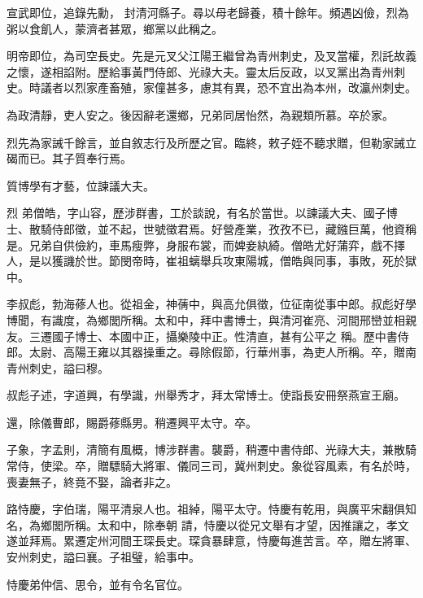 \begin{pinyinscope}
 宣武即位，追錄先勳，
 封清河縣子。尋以母老歸養，積十餘年。頻遇凶儉，烈為粥以食飢人，蒙濟者甚眾，鄉黨以此稱之。



 明帝即位，為司空長史。先是元叉父江陽王繼曾為青州刺史，及叉當權，烈託故義之懷，遂相諂附。歷給事黃門侍郎、光祿大夫。靈太后反政，以叉黨出為青州刺史。時議者以烈家產畜殖，家僮甚多，慮其有異，恐不宜出為本州，改瀛州刺史。



 為政清靜，吏人安之。後因辭老還鄉，兄弟同居怡然，為親類所慕。卒於家。



 烈先為家誡千餘言，並自敘志行及所歷之官。臨終，敕子姪不聽求贈，但勒家誡立碣而已。其子質奉行焉。



 質博學有才藝，位諫議大夫。



 烈
 弟僧皓，字山容，歷涉群書，工於談說，有名於當世。以諫議大夫、國子博士、散騎侍郎徵，並不起，世號徵君焉。好營產業，孜孜不已，藏鏹巨萬，他資稱是。兄弟自供儉約，車馬瘦弊，身服布裳，而婢妾紈綺。僧皓尤好蒲弈，戲不擇人，是以獲譏於世。節閔帝時，崔祖螭舉兵攻東陽城，僧皓與同事，事敗，死於獄中。



 李叔彪，勃海蓚人也。從祖金，神蒨中，與高允俱徵，位征南從事中郎。叔彪好學博聞，有識度，為鄉閭所稱。太和中，拜中書博士，與清河崔亮、河間邢巒並相親友。三遷國子博士、本國中正，攝樂陵中正。性清直，甚有公平之
 稱。歷中書侍郎。太尉、高陽王雍以其器操重之。尋除假節，行華州事，為吏人所稱。卒，贈南青州刺史，謚曰穆。



 叔彪子述，字道興，有學識，州舉秀才，拜太常博士。使詣長安冊祭燕宣王廟。



 還，除儀曹郎，賜爵蓚縣男。稍遷興平太守。卒。



 子象，字孟則，清簡有風概，博涉群書。襲爵，稍遷中書侍郎、光祿大夫，兼散騎常侍，使梁。卒，贈驃騎大將軍、儀同三司，冀州刺史。象從容風素，有名於時，喪妻無子，終竟不娶，論者非之。



 路恃慶，字伯瑞，陽平清泉人也。祖綽，陽平太守。恃慶有乾用，與廣平宋翻俱知名，為鄉閭所稱。太和中，除奉朝
 請，恃慶以從兄文舉有才望，因推讓之，孝文遂並拜焉。累遷定州河間王琛長史。琛貪暴肆意，恃慶每進苦言。卒，贈左將軍、安州刺史，謚曰襄。子祖璧，給事中。



 恃慶弟仲信、思令，並有令名官位。




\end{pinyinscope}
